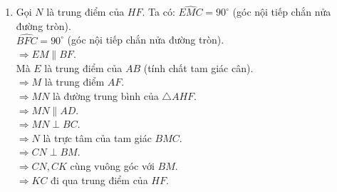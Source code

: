 \begin{ex}
{\begin{enumerate}
\begin{itemize}
                $\widehat{AFH}=\widehat{ADC}=90^\circ$.\\
                $\Rightarrow \triangle AFH \backsim \triangle ADC$(g-g).\\
                $\Rightarrow AH.AD = AF.AC$.\\  
        		$\Rightarrow AI^2=AH.AD$ \\
        	\item Xét $\triangle AID$ và $\triangle AHI$ có:\\
        		$\widehat{A}$ chung.\\
            	$AI^2=AH.AD$ (cmt).\\
            	$\Rightarrow \triangle AID \backsim \triangle AHI$(c-g-c).\\
            	$\Rightarrow \widehat{AHI}=\widehat{AID}$.  
         \end{itemize}
	  \item
      Gọi $N$ là trung điểm của $HF$.
      Ta có: $\widehat{EMC}=90^\circ$ (góc nội tiếp chắn nửa đường tròn).\\
      $\widehat{BFC}=90^\circ$ (góc nội tiếp chắn nửa đường tròn).\\
      $\Rightarrow EM \parallel BF$.\\
      Mà $E$ là trung điểm của $AB$ (tính chất tam giác cân).\\
      $\Rightarrow M$ là trung điểm $AF$.\\
      $\Rightarrow MN$ là đường trung bình của $\triangle AHF$.\\
      $\Rightarrow MN \parallel AD$.\\
      $\Rightarrow MN \perp BC$.\\
      $\Rightarrow N$ là trực tâm của tam giác $BMC$.\\
      $\Rightarrow CN \perp BM$.\\
      $\Rightarrow CN, CK$ cùng vuông góc với $BM$.\\
      $\Rightarrow KC$ đi qua trung điểm của $HF$. 
      \end{enumerate}
      
    }
\end{ex}

